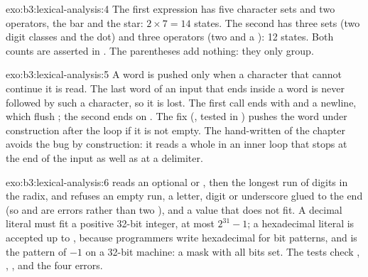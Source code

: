 \begin{solution}{exo:b3:lexical-analysis:4}
The first expression has five character sets and two operators, the bar and the star: $2 \times 7 = 14$ states. The second has three sets (two digit classes and the dot) and three operators (two \code{+} and a ): 12 states. Both counts are asserted in . The parentheses add nothing: they only group.
\end{solution}

\begin{solution}{exo:b3:lexical-analysis:5}
A word is pushed only when a character that cannot continue it is read. The last word of an input that ends inside a word is never followed by such a character, so it is lost. The first call ends with \code{;} and a newline, which flush ; the second ends on . The fix (, tested in ) pushes the word under construction after the loop if it is not empty. The hand-written  of the chapter avoids the bug by construction: it reads a whole  in an inner loop that stops at the end of the input as well as at a delimiter.
\end{solution}

\begin{solution}{exo:b3:lexical-analysis:6}
 reads an optional  or , then the longest run of digits in the radix, and refuses an empty run, a letter, digit or underscore glued to the end (so  and  are errors rather than two ), and a value that does not fit. A decimal literal must fit a positive 32-bit integer, at most $2^{31} - 1$; a hexadecimal literal is accepted up to , because programmers write hexadecimal for bit patterns, and  is the pattern of $-1$ on a 32-bit machine: a mask with all bits set. The tests check , , ,  and the four errors.
\end{solution}

